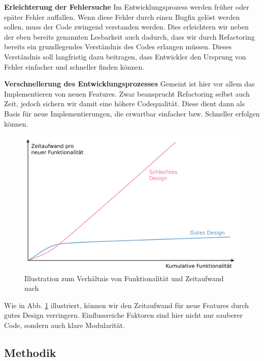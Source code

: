 \documentclass[acmtog]{acmart}
\begin{document}
\textbf{Erleichterung der Fehlersuche}
Im Entwicklungsprozess werden früher oder später Fehler auffallen. Wenn diese Fehler durch einen Bugfix gelöst werden sollen, muss der Code zwingend verstanden werden. Dies erleichtern wir neben der eben bereits genannten Lesbarkeit auch dadurch, dass wir durch Refactoring bereits ein grundlegendes Verständnis des Codes erlangen müssen. Dieses Verständnis soll langfristig dazu beitragen, dass Entwickler den Ursprung von Fehler einfacher und schneller finden können.

\textbf{Verschnellerung des Entwicklungsprozesses}
Gemeint ist hier vor allem das Implementieren von neuen Features. Zwar beansprucht Refactoring selbst auch Zeit, jedoch sichern wir damit eine höhere Codequalität. Diese dient dann als Basis für neue Implementierungen, die erwartbar einfacher bzw. Schneller erfolgen können.\cite{10.1007/978-3-540-85279-7_20}

\begin{figure}[h]
  \centering
  \includegraphics[width=\linewidth]{images/FowlerChart.png}
  \caption{Illustration zum Verhältnis von Funktionalität und Zeitaufwand nach \cite{fowler2019refactoring}}
  \label{fig:Refactoring_Graph}
\end{figure}

Wie in Abb. \ref{fig:Refactoring_Graph} illustriert, können wir den Zeitaufwand für neue Features durch gutes Design verringern. Einflussreiche Faktoren sind hier nicht nur sauberer Code, sondern auch klare Modularität.\cite{fowler2019refactoring}


\subsection{Methodik}\label{sec:Refactoring_Methodik}
\end{document}
